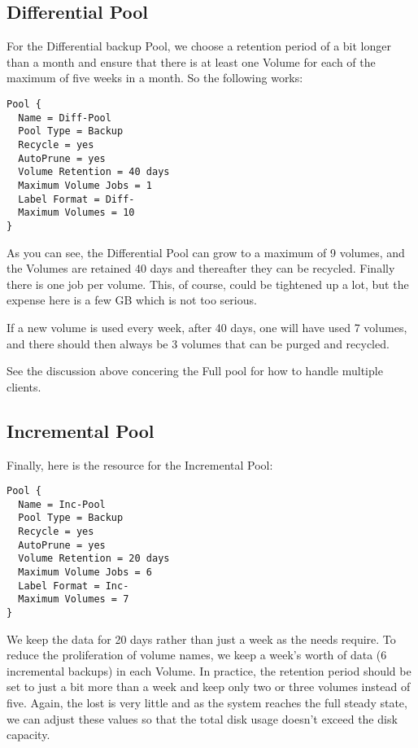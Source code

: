 \label{DiffPool}
\subsection{Differential Pool}

For the Differential backup Pool, we choose a retention period of a bit longer
than a month and ensure that there is at least one Volume for each of the
maximum of five weeks in a month. So the following works: 

\footnotesize
\begin{verbatim}
Pool {
  Name = Diff-Pool
  Pool Type = Backup
  Recycle = yes
  AutoPrune = yes
  Volume Retention = 40 days
  Maximum Volume Jobs = 1
  Label Format = Diff-
  Maximum Volumes = 10
}
\end{verbatim}
\normalsize

As you can see, the Differential Pool can grow to a maximum of 9 volumes,
and the Volumes are retained 40 days and thereafter they can be recycled. Finally
there is one job per volume. This, of course, could be tightened up a lot, but
the expense here is a few GB which is not too serious. 

If a new volume is used every week, after 40 days, one will have used 7
volumes, and there should then always be 3 volumes that can be purged and
recycled.

See the discussion above concering the Full pool for how to handle multiple
clients.

\label{IncPool}
\subsection{Incremental Pool}

Finally, here is the resource for the Incremental Pool: 

\footnotesize
\begin{verbatim}
Pool {
  Name = Inc-Pool
  Pool Type = Backup
  Recycle = yes
  AutoPrune = yes
  Volume Retention = 20 days
  Maximum Volume Jobs = 6
  Label Format = Inc-
  Maximum Volumes = 7
}
\end{verbatim}
\normalsize

We keep the data for 20 days rather than just a week as the needs require. To
reduce the proliferation of volume names, we keep a week's worth of data (6
incremental backups) in each Volume. In practice, the retention period should
be set to just a bit more than a week and keep only two or three volumes
instead of five. Again, the lost is very little and as the system reaches the
full steady state, we can adjust these values so that the total disk usage
doesn't exceed the disk capacity. 

